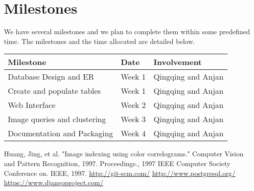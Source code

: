 \documentclass[a4paper,12pt]{article}
\begin{document}
\section*{Milestones}
We have several milestones and we plan to complete them within some predefined time. The milestones and the time allocated are detailed below.


\begin{center}
  \begin{tabular}{| l | l | l |}
  \hline
      Milestone & Date & Involvement \\ 
  \hline
  \hline
    Database Design and ER & Week 1 & Qingqing and Anjan \\ \hline
    Create and populate tables & Week 1 & Qingqing and Anjan \\ \hline
    Web Interface & Week 2 & Qingqing and Anjan \\ \hline
    Image queries and clustering & Week 3 & Qingqing and Anjan \\ \hline
    Documentation and Packaging & Week 4 & Qingqing and Anjan \\ \hline
  \end{tabular}
\end{center}


\begin{thebibliography}{50}
  Huang, Jing, et al. "Image indexing using color correlograms." Computer Vision and Pattern Recognition, 1997. Proceedings., 1997 IEEE Computer Society Conference on. IEEE, 1997.
  \url{http://git-scm.com/}
  \url{http://www.postgresql.org/}
  \url{https://www.djangoproject.com/}
  
\end{thebibliography}
\end{document}
